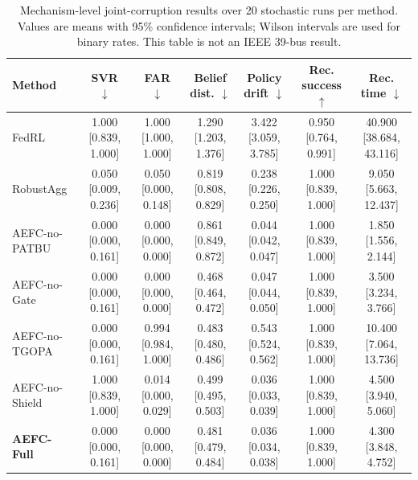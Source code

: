 \begin{table}[t]
\centering
\caption{Mechanism-level joint-corruption results over 20 stochastic runs per method. Values are means with 95\% confidence intervals; Wilson intervals are used for binary rates. This table is not an IEEE 39-bus result.}
\label{tab:joint-mechanism}
\scriptsize
\begin{tabular}{lcccccc}
\toprule
Method & SVR $\downarrow$ & FAR $\downarrow$ & Belief dist. $\downarrow$ & Policy drift $\downarrow$ & Rec. success $\uparrow$ & Rec. time $\downarrow$\\
\midrule
FedRL & 1.000 [0.839, 1.000] & 1.000 [1.000, 1.000] & 1.290 [1.203, 1.376] & 3.422 [3.059, 3.785] & 0.950 [0.764, 0.991] & 40.900 [38.684, 43.116]\\
RobustAgg & 0.050 [0.009, 0.236] & 0.050 [0.000, 0.148] & 0.819 [0.808, 0.829] & 0.238 [0.226, 0.250] & 1.000 [0.839, 1.000] & 9.050 [5.663, 12.437]\\
AEFC-no-PATBU & 0.000 [0.000, 0.161] & 0.000 [0.000, 0.000] & 0.861 [0.849, 0.872] & 0.044 [0.042, 0.047] & 1.000 [0.839, 1.000] & 1.850 [1.556, 2.144]\\
AEFC-no-Gate & 0.000 [0.000, 0.161] & 0.000 [0.000, 0.000] & 0.468 [0.464, 0.472] & 0.047 [0.044, 0.050] & 1.000 [0.839, 1.000] & 3.500 [3.234, 3.766]\\
AEFC-no-TGOPA & 0.000 [0.000, 0.161] & 0.994 [0.984, 1.000] & 0.483 [0.480, 0.486] & 0.543 [0.524, 0.562] & 1.000 [0.839, 1.000] & 10.400 [7.064, 13.736]\\
AEFC-no-Shield & 1.000 [0.839, 1.000] & 0.014 [0.000, 0.029] & 0.499 [0.495, 0.503] & 0.036 [0.033, 0.039] & 1.000 [0.839, 1.000] & 4.500 [3.940, 5.060]\\
\textbf{AEFC-Full} & 0.000 [0.000, 0.161] & 0.000 [0.000, 0.000] & 0.481 [0.479, 0.484] & 0.036 [0.034, 0.038] & 1.000 [0.839, 1.000] & 4.300 [3.848, 4.752]\\
\bottomrule
\end{tabular}
\end{table}
